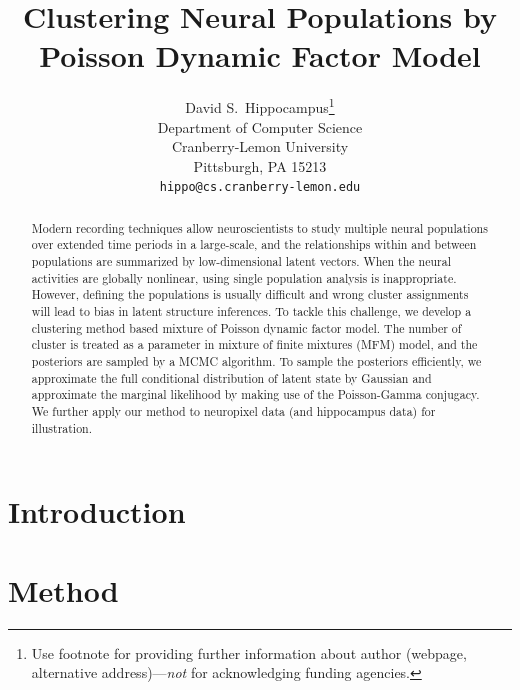 \documentclass{article}
\title{Clustering Neural Populations by Poisson Dynamic Factor Model}
\author{%
	David S.~Hippocampus\thanks{Use footnote for providing further information
		about author (webpage, alternative address)---\emph{not} for acknowledging
		funding agencies.} \\
	Department of Computer Science\\
	Cranberry-Lemon University\\
	Pittsburgh, PA 15213 \\
	\texttt{hippo@cs.cranberry-lemon.edu} \\
}
\begin{document}
	
	\maketitle
	
	\begin{abstract}
	Modern recording techniques allow neuroscientists to study multiple neural populations over extended time periods in a large-scale, and the relationships within and between populations are summarized by low-dimensional latent vectors. When the neural activities are globally nonlinear, using single population analysis is inappropriate. However, defining the populations is usually difficult and  wrong cluster assignments will lead to bias in latent structure inferences. To tackle this challenge, we develop a clustering method based mixture of Poisson dynamic factor model. The number of cluster is treated as a parameter in mixture of finite mixtures (MFM) model, and the posteriors are sampled by a MCMC algorithm. To sample the posteriors efficiently, we approximate the full conditional distribution of latent state by Gaussian and approximate the marginal likelihood by making use of the Poisson-Gamma conjugacy. We further apply our method to neuropixel data (and hippocampus data) for illustration.
	\end{abstract}
	
	\section{Introduction}
	\label{intro}
	\answerTODO{}
	
	\section{Method}
	\label{method}
	
\end{document}
